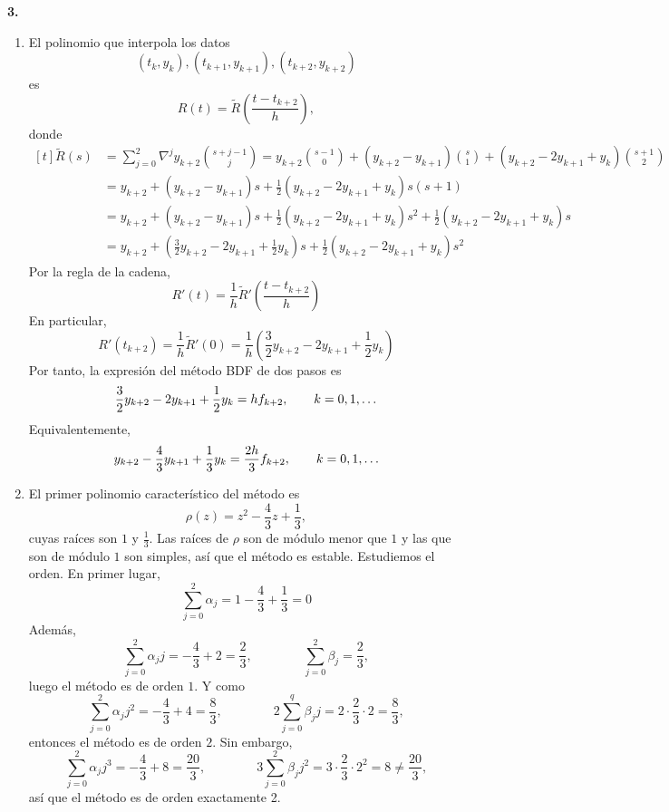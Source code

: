 \documentclass[11pt]{report}
\begin{document}
\textbf{3. }

\begin{enumerate}
    \item El polinomio que interpola los datos
    \[(t_k,y_k),(t_{k+1},y_{k+1}),(t_{k+2},y_{k+2})\]
    es
    \[R(t)=\widetilde{R}\left(\frac{t-t_{k+2}}{h}\right),\]
    donde
    \[\begin{aligned}[t]
        \widetilde{R}(s)&=\sum_{j=0}^2 \nabla^jy_{k+2}\binom{s+j-1}{j} = y_{k+2}\binom{s-1}{0} +(y_{k+2}-y_{k+1})\binom{s}{1}+(y_{k+2}-2y_{k+1}+y_k)\binom{s+1}{2} \\
        &= y_{k+2}+(y_{k+2}-y_{k+1})s+\frac{1}{2}(y_{k+2}-2y_{k+1}+y_k)s(s+1) \\ &= y_{k+2}+(y_{k+2}-y_{k+1})s+\frac{1}{2}(y_{k+2}-2y_{k+1}+y_k)s^2+\frac{1}{2}(y_{k+2}-2y_{k+1}+y_k)s \\
        &= y_{k+2}+\left(\frac{3}{2}y_{k+2}-2y_{k+1}+\frac{1}{2}y_k\right)s+\frac{1}{2}\left(y_{k+2}-2y_{k+1}+y_k\right)s^2
    \end{aligned}
    \]
    Por la regla de la cadena,
    \[R'(t) = \frac{1}{h}\widetilde{R}'\left(\frac{t-t_{k+2}}{h}\right)\]
    En particular,
    \[R'(t_{k+2}) = \frac{1}{h}\widetilde{R}'(0) = \frac{1}{h}\left(\frac{3}{2}y_{k+2}-2y_{k+1}+\frac{1}{2}y_k\right)\]
    Por tanto, la expresión del método BDF de dos pasos es
    \[\frac{3}{2}y_{k+2}-2y_{k+1}+\frac{1}{2}y_k = hf_{k+2}, \qquad k = 0,1,\mathellipsis\]
    Equivalentemente,
    \[y_{k+2}-\frac{4}{3}y_{k+1}+\frac{1}{3}y_k = \frac{2h}{3}f_{k+2}, \qquad k = 0,1,\mathellipsis\]
    \item El primer polinomio característico del método es
    \[\rho(z)=z^2-\frac{4}{3}z+\frac{1}{3},\]
    cuyas raíces son $1$ y $\frac{1}{3}$. Las raíces de $\rho$ son de módulo menor que $1$ y las que son de módulo $1$ son simples, así que el método es estable. Estudiemos el orden. En primer lugar,
    \[\sum_{j=0}^2 \alpha_j = 1-\frac{4}{3}+\frac{1}{3} = 0\]
    Además,
    \[\sum_{j=0}^2\alpha_j j = -\frac{4}{3}+2 = \frac{2}{3}, \qquad \qquad \sum_{j=0}^2 \beta_j =\frac{2}{3},\]
    luego el método es de orden $1$. Y como
    \[\sum_{j=0}^2 \alpha_jj^2 = -\frac{4}{3}+4 = \frac{8}{3}, \qquad \qquad 2\sum_{j=0}^q \beta_jj = 2 \cdot \frac{2}{3} \cdot 2 = \frac{8}{3},\]
    entonces el método es de orden $2$. Sin embargo,
    \[\sum_{j=0}^2 \alpha_jj^3 = -\frac{4}{3}+8 = \frac{20}{3}, \qquad \qquad 3 \sum_{j=0}^2\beta_jj^2= 3 \cdot \frac{2}{3} \cdot 2^2 = 8 \neq \frac{20}{3},\]
    así que el método es de orden exactamente 2.
\end{enumerate}
\end{document}
